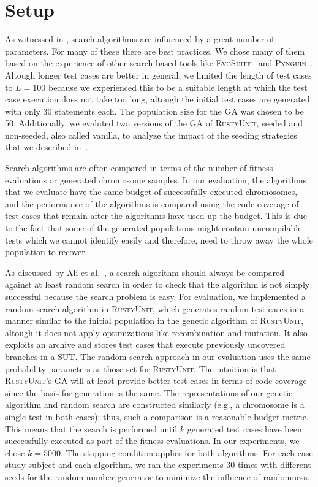 \documentclass[paper=a4,%
  twoside,%
  BCOR4mm,%
  abstract=true,%
  toc=bibliography,%
  chapterprefix=true,%
  toc=bibliographynumbered,%
  open=right,%
  english,%
  pagesize=pdftex]{scrreprt}
\newcommand{\tech}{\textsc{RustyUnit}\xspace}
\newcommand{\runs}{30\xspace}
\newcommand{\budget}{5000\xspace}
\newcommand{\sut}{\ac{SUT}\xspace}
\newcommand{\ga}{\ac{GA}\xspace}
\newcommand{\testlength}{100\xspace}
\newcommand{\inittestlength}{30\xspace}
\newcommand{\populationsize}{50\xspace}
\begin{document}
\section{Setup}
\label{sec:environment-setup}
As witnessed in , search algorithms are influenced by a great number of parameters. For many of these there are best practices. We chose many of them based on the experience of other search-based tools like \textsc{EvoSuite}~\cite{Fraser_2011a} and \textsc{Pynguin}~\cite{Lukasczyk2020}. Altough longer test cases are better in general, we limited the length of test cases to $L = \testlength$ because we experienced this to be a suitable length at which the test case execution does not take too long, altough the initial test cases are generated with only \inittestlength statements each. The population size for the \ac{GA} was chosen to be \populationsize. Additionally, we evaluted two versions of the \ga of \tech, seeded and non-seeded, also called vanilla, to analyze the impact of the seeding strategies that we described in~.

Search algorithms are often compared in terms of the number of fitness evaluations or generated chromosome samples. In our evaluation, the algorithms that we evaluate have the same budget of successfully executed chromosomes, and the performance of the algorithms is compared using the code coverage of test cases that remain after the algorithms have used up the budget. This is due to the fact that some of the generated populations might contain uncompilable tests which we cannot identify easily and therefore, need to throw away the whole population to recover.

As discussed by Ali et al.~\cite{Ali2010}, a search algorithm should always be compared against at least random search in order to check that the algorithm is not simply successful because the search problem is easy. For evaluation, we implemented a random search algorithm in \tech, which generates random test cases in a manner similar to the initial population in the genetic algorithm of \tech, altough it does not apply optimizations like recombination and mutation. It also exploits an archive and stores test cases that execute previously uncovered branches in a \sut. The random search approach in our evaluation uses the same probability parameters as those set for \tech. The intuition is that \tech's \ac{GA} will at least provide better test cases in terms of code coverage since the basis for generation is the same. %
The representations of our genetic algorithm and random search are constructed similarly (e.g., a chromosome is a single test in both cases); thus, such a comparison is a reasonable budget metric. This means that the search is performed until $k$ generated test cases have been successfully executed as part of the fitness evaluations. In our experiments, we chose $k = \budget$. The stopping condition applies for both algorithms. For each case study subject and each algorithm, we ran the experiments \runs times with different seeds for the random number generator to minimize the influence of randomness.
\end{document}
